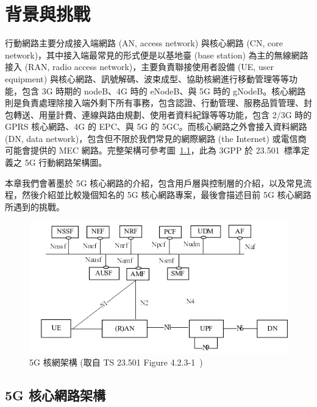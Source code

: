\chapter{背景與挑戰}
\label{chapter:background}


行動網路主要分成接入端網路 (AN, access network) 與核心網路 (CN, core network)，其中接入端最常見的形式便是以基地臺 (base station) 為主的無線網路接入 (RAN, radio access network)，主要負責聯接使用者設備 (UE, user equipment) 與核心網路、訊號解碼、波束成型、協助核網進行移動管理等等功能，包含 3G 時期的 nodeB、4G 時的 eNodeB、與 5G 時的 gNodeB。核心網路則是負責處理除接入端外剩下所有事務，包含認證、行動管理、服務品質管理、封包轉送、用量計費、連線與路由規劃、使用者資料紀錄等等功能，包含 2/3G 時的 GPRS 核心網路、4G 的 EPC、與 5G 的 5GC。而核心網路之外會接入資料網路 (DN, data network)，包含但不限於我們常見的網際網路 (the Internet) 或電信商可能會提供的 MEC 網路。完整架構可參考圖~\ref{fig:5g_core_arch}，此為 3GPP 於 23.501~\cite{3gpp.23.501}標準定義之 5G 行動網路架構圖。

本章我們會著墨於 5G 核心網路的介紹，包含用戶層與控制層的介紹，以及常見流程，然後介紹並比較幾個知名的 5G 核心網路專案，最後會描述目前 5G 核心網路所遇到的挑戰。

\begin{figure}[htbp]
    \centering
    \includegraphics[height=!,width=1\linewidth,keepaspectratio=true]{figures/23_501_4-2-3-1_sys_arch_sbi}
    \caption[5G 核網架構]{{\footnotesize 5G 核網架構 (取自 TS 23.501 Figure 4.2.3-1~\cite{3gpp.23.501})}}
    \label{fig:5g_core_arch}
\end{figure}

\section{5G 核心網路架構}
\label{sec:5g_core}

